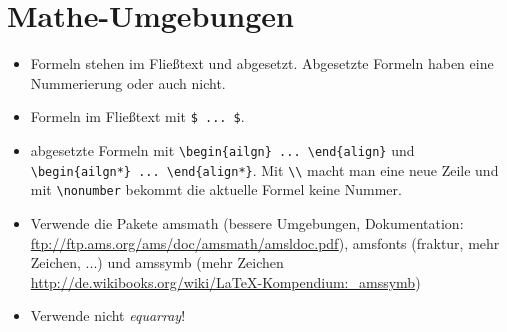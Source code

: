 \documentclass[11pt,a4paper]{scrartcl}
\begin{document}
\section{Mathe-Umgebungen}
\begin{itemize}
\item Formeln stehen im Fließtext und abgesetzt. Abgesetzte Formeln haben eine Nummerierung oder auch nicht.
\item Formeln im Fließtext mit \verb|$ ... $|.
\item abgesetzte Formeln mit \verb|\begin{ailgn} ... \end{align}| und \verb|\begin{ailgn*} ... \end{align*}|. Mit \verb|\\| macht man eine neue Zeile und mit \verb|\nonumber| bekommt die aktuelle Formel keine Nummer.
\item Verwende die Pakete amsmath (bessere Umgebungen, Dokumentation: \url{ftp://ftp.ams.org/ams/doc/amsmath/amsldoc.pdf}), amsfonts (fraktur, mehr Zeichen, ...) und amssymb (mehr Zeichen \url{http://de.wikibooks.org/wiki/LaTeX-Kompendium:_amssymb})
\item Verwende nicht \emph{equarray}! 
\end{itemize} 
\end{document}
